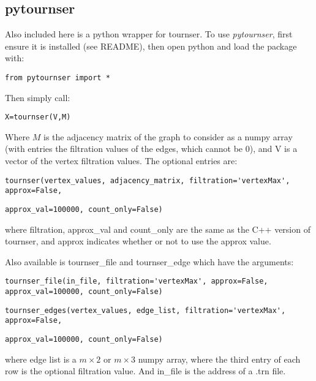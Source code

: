 \documentclass{amsart}
\theoremstyle{definition}
\begin{document}
\subsection{pytournser}
Also included here is a python wrapper for tournser. To use \textit{pytournser}, first ensure it is installed (see README), then open python and load the package with:
\begin{verbatim}from pytournser import *\end{verbatim}
Then simply call:
\begin{verbatim}X=tournser(V,M)\end{verbatim}
Where $M$ is the adjacency matrix of the graph to consider as a numpy array (with entries the filtration values of the edges, which cannot be $0$), and V is a vector of the vertex filtration values. The optional entries are:
\begin{verbatim}tournser(vertex_values, adjacency_matrix, filtration='vertexMax', approx=False,\end{verbatim} 
\begin{verbatim}approx_val=100000, count_only=False)\end{verbatim}
where filtration, approx\_val and count\_only are the same as the C++ version of tournser, and approx indicates whether or not to use the approx value.

Also available is tournser\_file and tournser\_edge which have the arguments:
\begin{verbatim}tournser_file(in_file, filtration='vertexMax', approx=False, approx_val=100000, count_only=False)\end{verbatim}
\begin{verbatim}tournser_edges(vertex_values, edge_list, filtration='vertexMax', approx=False,\end{verbatim}
\begin{verbatim}approx_val=100000, count_only=False)\end{verbatim}
where edge list is a $m\times2$ or $m\times 3$ numpy array, where the third entry of each row is the optional filtration value. And in\_file is the address of a .trn file.

\vfill
\end{document}
